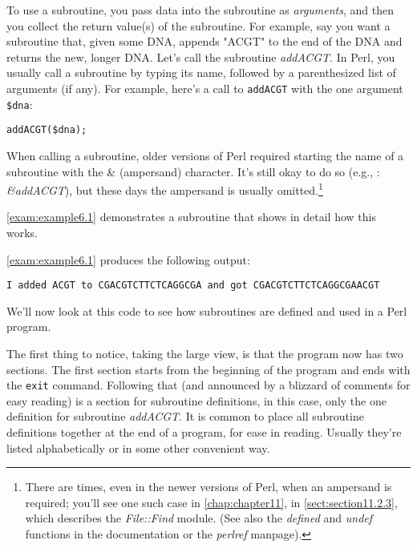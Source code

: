 To use a subroutine, you pass data into the subroutine as \textit{arguments}, and then you collect the return value(s) of the subroutine. For example, say you want a subroutine that, given some DNA, appends "ACGT" to the end of the DNA and returns the new, longer DNA. Let's call the subroutine \textit{addACGT}. In Perl, you usually call a subroutine by typing its name, followed by a parenthesized list of arguments (if any). For example, here's a call to \verb|addACGT| with the one argument \verb|$dna|: 

\begin{lstlisting}
addACGT($dna);
\end{lstlisting}

When calling a subroutine, older versions of Perl required starting the name of a subroutine with the \& (ampersand) character. It's still okay to do so (e.g., : \textit{\&addACGT}), but these days the ampersand is usually omitted.\footnote{There are times, even in the newer versions of Perl, when an ampersand is required; you'll see one such case in \autoref{chap:chapter11}, in \autoref{sect:section11.2.3}, which describes the \textit{File::Find} module. (See also the \textit{defined} and \textit{undef} functions in the documentation or the \textit{perlref} manpage).}

\autoref{exam:example6.1} demonstrates a subroutine that shows in detail how this works. 



\autoref{exam:example6.1} produces the following output:

\begin{lstlisting}
I added ACGT to CGACGTCTTCTCAGGCGA and got CGACGTCTTCTCAGGCGAACGT
\end{lstlisting}

We'll now look at this code to see how subroutines are defined and used in a Perl program. 

The first thing to notice, taking the large view, is that the program now has two sections. The first section starts from the beginning of the program and ends with the \verb|exit| command. Following that (and announced by a blizzard of comments for easy reading) is a section for subroutine definitions, in this case, only the one definition for subroutine \textit{addACGT}. It is common to place all subroutine definitions together at the end of a program, for ease in reading. Usually they're listed alphabetically or in some other convenient way.

